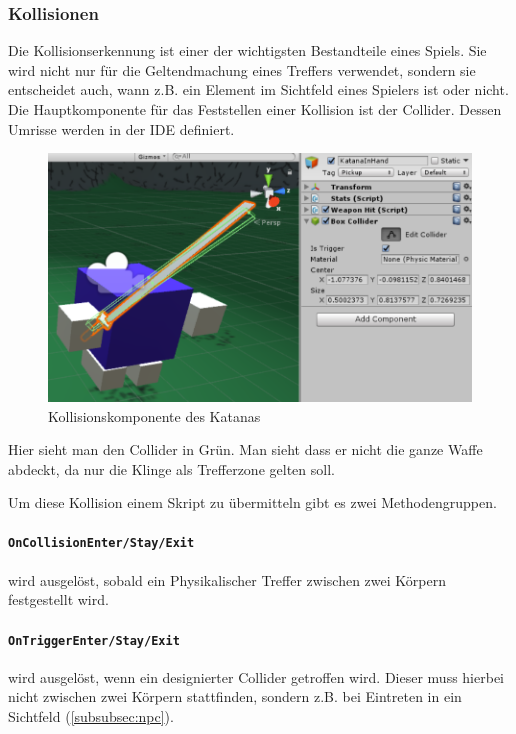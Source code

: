 \subsubsection{Kollisionen}
\label{subsubsec:collider}
Die Kollisionserkennung ist einer der wichtigsten Bestandteile eines Spiels. Sie wird nicht nur für die Geltendmachung eines Treffers verwendet, sondern sie entscheidet auch, wann z.B. ein Element im Sichtfeld eines Spielers ist oder nicht.
Die Hauptkomponente für das Feststellen einer Kollision ist der Collider.
Dessen Umrisse werden in der IDE definiert.
\begin{figure}[H]
\includegraphics[scale=0.8]{screenshots/katanacollider.png}
\caption{Kollisionskomponente des Katanas}
\end{figure}
Hier sieht man den Collider in Grün. Man sieht dass er nicht die ganze Waffe abdeckt, da nur die Klinge als Trefferzone gelten soll.

Um diese Kollision einem Skript zu übermitteln gibt es zwei Methodengruppen.
\paragraph{\lstinline{OnCollisionEnter/Stay/Exit}} wird ausgelöst, sobald ein Physikalischer Treffer zwischen zwei Körpern festgestellt wird.
\paragraph{\lstinline{OnTriggerEnter/Stay/Exit}} wird ausgelöst, wenn ein designierter Collider getroffen wird. Dieser muss hierbei nicht zwischen zwei Körpern stattfinden, sondern z.B. bei Eintreten in ein Sichtfeld (\cref{subsubsec:npc}).






